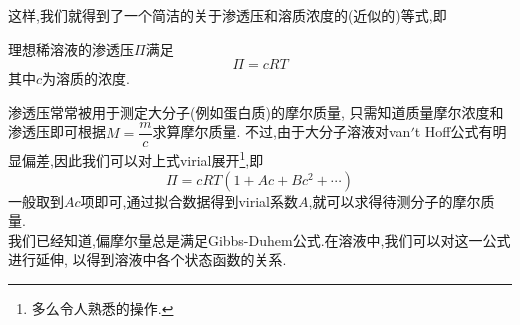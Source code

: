 \documentclass{ctexart}
\begin{document}
这样,我们就得到了一个简洁的关于渗透压和溶质浓度的(近似的)等式,即
\begin{theorem}
    理想稀溶液的渗透压$\Pi$满足
    \[\Pi=cRT\]
    其中$c$为溶质的浓度.
\end{theorem}
渗透压常常被用于测定大分子(例如蛋白质)的摩尔质量,%
只需知道质量摩尔浓度和渗透压即可根据$M=\dfrac{m}{c}$求算摩尔质量.%
不过,由于大分子溶液对van$'$t Hoff公式有明显偏差,因此我们可以对上式virial展开\footnote{多么令人熟悉的操作.},即
\[\Pi=cRT\left(1+Ac+Bc^2+\cdots\right)\]
一般取到$Ac$项即可,通过拟合数据得到virial系数$A$,就可以求得待测分子的摩尔质量.\vspace{12pt}\\
\indent 我们已经知道,偏摩尔量总是满足Gibbs-Duhem公式.在溶液中,我们可以对这一公式进行延伸,%
以得到溶液中各个状态函数的关系.
\end{document}
